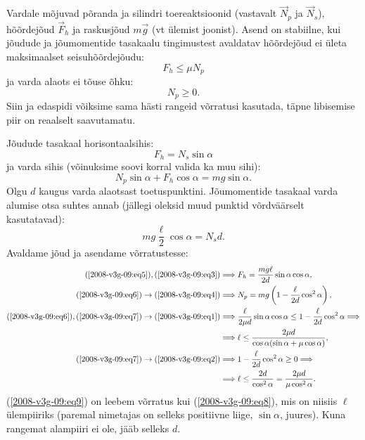 \documentclass[10pt]{article}
\begin{document}
{Vardale mõjuvad põranda ja silindri toereaktsioonid (vastavalt $\vec N_p$ ja $\vec N_s$), hõõrdejõud $\vec F_h$ ja raskusjõud $m\vec g$ (vt ülemist joonist). Asend on stabiilne, kui jõudude ja jõumomentide tasakaalu tingimustest avaldatav hõõrdejõud ei ületa maksimaalset seisuhõõrdejõudu:
\begin{equation} \label{2008-v3g-09:eq1}
F_{h} \leq \mu N_{p}
\end{equation}
ja varda alaots ei tõuse õhku:
\begin{equation} \label{2008-v3g-09:eq2}
N_p \geq 0.
\end{equation}
Siin ja edaspidi võiksime sama hästi rangeid võrratusi kasutada, täpne libisemise piir on reaalselt saavutamatu.

Jõudude tasakaal horisontaalsihis:
\begin{equation} \label{2008-v3g-09:eq3}
F_h = N_s \sin \alpha
\end{equation}
ja varda sihis (võinuksime soovi korral valida ka muu sihi):
\begin{equation} \label{2008-v3g-09:eq4}
N_p \sin \alpha + F_h \cos \alpha = mg \sin \alpha.
\end{equation}
Olgu $d$ kaugus varda alaotsast toetuspunktini. Jõumomentide tasakaal varda alumise otsa suhtes annab (jällegi oleksid muud punktid võrdväärselt kasutatavad):
\begin{equation} \label{2008-v3g-09:eq5}
mg \frac{\ell}{2} \cos \alpha = N_sd.
\end{equation}
Avaldame jõud ja asendame võrratustesse:
\begin{align}
	(\ref{2008-v3g-09:eq5}),(\ref{2008-v3g-09:eq3}) & \Longrightarrow F_{h}=\frac{m g \ell}{2 d} \sin \alpha \cos \alpha, \label{2008-v3g-09:eq6}\\
	(\ref{2008-v3g-09:eq6}) \rightarrow(\ref{2008-v3g-09:eq4}) & \Longrightarrow N_{p}=m g\left(1-\frac{\ell}{2 d} \cos ^{2} \alpha\right),\label{2008-v3g-09:eq7} \\
	(\ref{2008-v3g-09:eq6}),(\ref{2008-v3g-09:eq7}) \rightarrow(\ref{2008-v3g-09:eq1}) & \Longrightarrow \frac{\ell}{2 \mu d} \sin \alpha \cos \alpha \leq 1-\frac{\ell}{2 d} \cos ^{2} \alpha \Longrightarrow\nonumber \\ 
	& \Longrightarrow \ell \leq \frac{2 \mu d}{\cos \alpha(\sin \alpha+\mu \cos \alpha)},\label{2008-v3g-09:eq8} \\
	(\ref{2008-v3g-09:eq7}) \rightarrow(\ref{2008-v3g-09:eq2}) & \Longrightarrow 1-\frac{\ell}{2 d} \cos ^{2} \alpha \geq 0 \Longrightarrow\nonumber \\ 
	& \Longrightarrow \ell \leq \frac{2 d}{\cos ^{2} \alpha}=\frac{2 \mu d}{\mu \cos ^{2} \alpha}. \label{2008-v3g-09:eq9}
\end{align}
(\ref{2008-v3g-09:eq9}) on leebem võrratus kui (\ref{2008-v3g-09:eq8}), mis on niisiis $\ell $ ülempiiriks (paremal nimetajas on selleks positiivne liige, $\sin \alpha$, juures). Kuna rangemat alampiiri ei ole, jääb selleks $d$.

}
\end{document}
